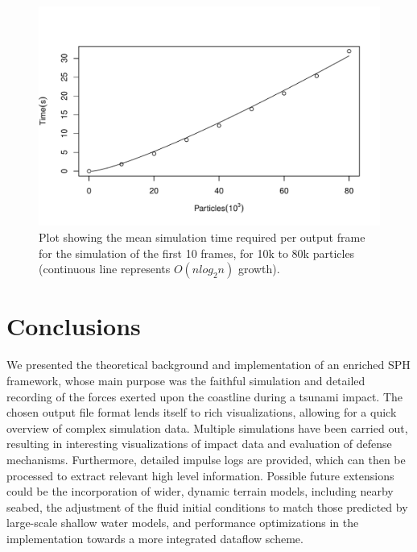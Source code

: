 \documentclass{llncs}
\begin{document}
\begin{figure}
  \includegraphics[width=\textwidth]{figures/performance.pdf}
  \caption{Plot showing the mean simulation time required per output frame for the
    simulation of the first 10 frames, for 10k to 80k particles (continuous line
    represents $O(n log_2n)$ growth).}
  \label{fig:performance}
\end{figure}

\section{Conclusions}
We presented the theoretical background and implementation of an enriched SPH framework,
whose main purpose was the faithful simulation and detailed recording of the forces
exerted upon the coastline during a tsunami impact. The chosen output file format lends
itself to rich visualizations, allowing for a quick overview of complex simulation
data. Multiple simulations have been carried out, resulting in interesting visualizations
of impact data and evaluation of defense mechanisms. Furthermore, detailed impulse logs
are provided, which can then be processed to extract relevant high level
information. Possible future extensions could be the incorporation of wider, dynamic
terrain models, including nearby seabed, the adjustment of the fluid initial conditions to
match those predicted by large-scale shallow water models, and performance optimizations
in the implementation towards a more integrated dataflow scheme.
\end{document}
